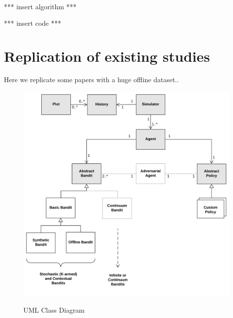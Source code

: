 \documentclass[nojss]{jss}\usepackage[]{graphicx}\usepackage[]{color}
\begin{document}
*** insert algorithm ***


*** insert code ***

\section{Replication of existing studies}

Here we replicate some papers with a huge offline dataset..

\begin{figure}[H]
  \centering
    \includegraphics[width=.99\textwidth]{fig/contextual_class}
    \label{fig:contextual_class}
      \caption{ UML Class Diagram}
\end{figure}
\end{document}
